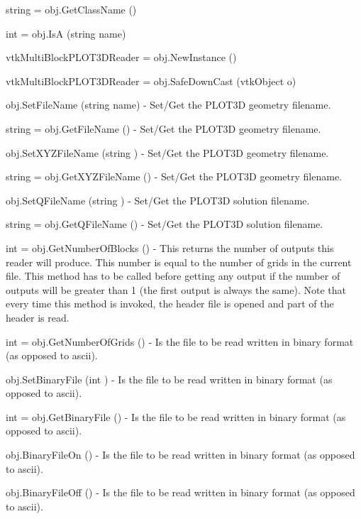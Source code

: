 \begin{DoxyItemize}
\item {\ttfamily string = obj.\-Get\-Class\-Name ()}  
\item {\ttfamily int = obj.\-Is\-A (string name)}  
\item {\ttfamily vtk\-Multi\-Block\-P\-L\-O\-T3\-D\-Reader = obj.\-New\-Instance ()}  
\item {\ttfamily vtk\-Multi\-Block\-P\-L\-O\-T3\-D\-Reader = obj.\-Safe\-Down\-Cast (vtk\-Object o)}  
\item {\ttfamily obj.\-Set\-File\-Name (string name)} -\/ Set/\-Get the P\-L\-O\-T3\-D geometry filename.  
\item {\ttfamily string = obj.\-Get\-File\-Name ()} -\/ Set/\-Get the P\-L\-O\-T3\-D geometry filename.  
\item {\ttfamily obj.\-Set\-X\-Y\-Z\-File\-Name (string )} -\/ Set/\-Get the P\-L\-O\-T3\-D geometry filename.  
\item {\ttfamily string = obj.\-Get\-X\-Y\-Z\-File\-Name ()} -\/ Set/\-Get the P\-L\-O\-T3\-D geometry filename.  
\item {\ttfamily obj.\-Set\-Q\-File\-Name (string )} -\/ Set/\-Get the P\-L\-O\-T3\-D solution filename.  
\item {\ttfamily string = obj.\-Get\-Q\-File\-Name ()} -\/ Set/\-Get the P\-L\-O\-T3\-D solution filename.  
\item {\ttfamily int = obj.\-Get\-Number\-Of\-Blocks ()} -\/ This returns the number of outputs this reader will produce. This number is equal to the number of grids in the current file. This method has to be called before getting any output if the number of outputs will be greater than 1 (the first output is always the same). Note that every time this method is invoked, the header file is opened and part of the header is read.  
\item {\ttfamily int = obj.\-Get\-Number\-Of\-Grids ()} -\/ Is the file to be read written in binary format (as opposed to ascii).  
\item {\ttfamily obj.\-Set\-Binary\-File (int )} -\/ Is the file to be read written in binary format (as opposed to ascii).  
\item {\ttfamily int = obj.\-Get\-Binary\-File ()} -\/ Is the file to be read written in binary format (as opposed to ascii).  
\item {\ttfamily obj.\-Binary\-File\-On ()} -\/ Is the file to be read written in binary format (as opposed to ascii).  
\item {\ttfamily obj.\-Binary\-File\-Off ()} -\/ Is the file to be read written in binary format (as opposed to ascii).  

\end{DoxyItemize}
